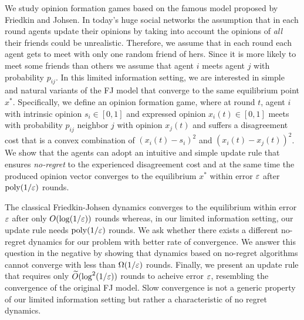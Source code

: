 We study opinion formation games based on the famous model proposed by Friedkin
and Johsen.  In today's huge social networks the assumption that in each round
agents update their opinions by taking into account the opinions of
\emph{all} their friends could be unrealistic. Therefore, we assume that
in each round each agent gets to meet with only one random friend of
hers. Since it is more likely to meet some friends than others we assume
that agent $i$ meets agent $j$ with probability $p_{ij}$.
In this limited information setting, we are interested in simple and
natural variants of the FJ model that converge to the same equilibrium point $x^*$.
Specifically, we define an opinion formation game, where at round $t$,
agent $i$ with intrinsic opinion $s_i\in[0,1]$ and expressed opinion $x_i(t)
\in[0,1]$ meets with probability $p_{ij}$ neighbor $j$ with opinion $x_j(t)$
and suffers a disagreement cost that is a convex combination of
$(x_i(t) - s_i)^2$ and $(x_i(t) - x_j(t))^2$.
We show that the agents can adopt an intuitive and simple update
rule that ensures \emph{no-regret} to the experienced disagreement cost
and at the same time the produced opinion vector converges
to the equilibrium $x^*$ within error $\varepsilon$ after
$\mathrm{poly}(1/\varepsilon)$ rounds.

The classical Friedkin-Johsen dynamics converges to the equilibrium within
error $\varepsilon$ after only $O(\log(1/\varepsilon))$ rounds whereas, in our limited
information setting, our update rule needs $\mathrm{poly}(1/\varepsilon)$ rounds.
We ask whether there exists a different no-regret dynamics for our problem
with better rate of convergence.  We answer this question in the negative
by showing that dynamics based on no-regret algorithms cannot converge with
less than $\Omega(1/\varepsilon)$ rounds.  Finally, we present an update rule that
requires only $\widetilde{O}(\log^2(1/\varepsilon))$ rounds to acheive error $\varepsilon$,
resembling the convergence of the original FJ model.  Slow convergence is not
a generic property of our limited information setting but rather a
characteristic of no regret dynamics.

